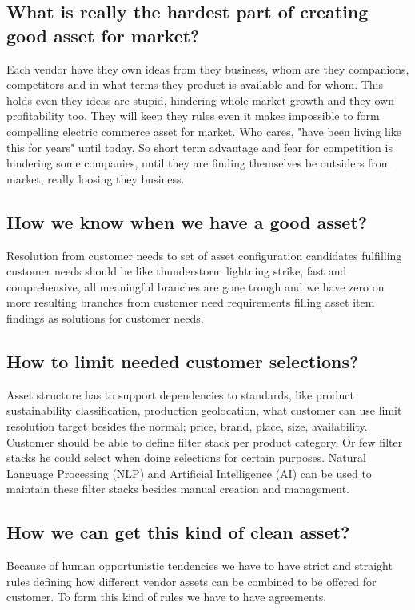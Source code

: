 \subsection{What is really the hardest part of creating good asset for market?}
\label{selfishness_obstacle}
Each vendor have they own ideas from they business, whom are they companions,
competitors and in what terms they product is available and for whom. This
holds even they ideas are stupid, hindering whole market growth and they own
profitability too. They will keep they rules even it makes impossible to form
compelling electric commerce asset for market. Who cares, "have been living
like this for years" until today. So short term advantage and fear for
competition is hindering some companies, until they are finding themselves be
outsiders from market, really loosing they business.

\subsection{How we know when we have a good asset?}
\label{asset_goodness}
Resolution from customer needs to set of asset configuration candidates
fulfilling customer needs should be like thunderstorm lightning strike, fast
and comprehensive, all meaningful branches are gone trough and we have zero on
more resulting branches from customer need requirements filling asset item
findings as solutions for customer needs.

\subsection{How to limit needed customer selections?}
\label{asset_search}
Asset structure has to support dependencies to standards, like product
sustainability classification, production geolocation, what customer can use
limit resolution target besides the normal; price, brand, place, size,
availability. Customer should be able to define filter stack per product
category. Or few filter stacks he could select when doing selections for
certain purposes. Natural Language Processing (NLP) and Artificial
Intelligence (AI) can be used to maintain these filter stacks besides manual
creation and management.

\subsection{How we can get this kind of clean asset?}
\label{asset_cleaness}
Because of human opportunistic tendencies\cite{SevenSins} we have to have
strict and straight rules defining how different vendor assets can be combined
to be offered for customer. To form this kind of rules we have to have
agreements.

